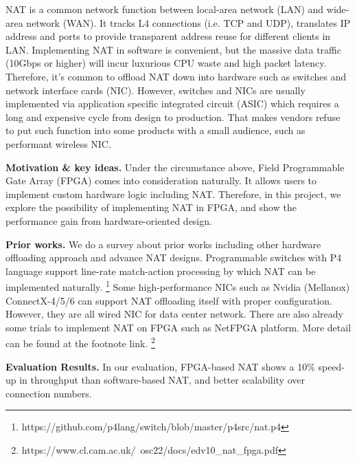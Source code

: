 





NAT is a common network function between local-area network (LAN) and wide-area
network (WAN). 
It tracks L4 connections (i.e. TCP and UDP), translates IP address and ports to 
provide transparent address reuse for different clients in LAN.
Implementing NAT in software is convenient, but the massive data traffic (10Gbps or higher) will incur luxurious CPU waste and high packet latency. Therefore, it's common to offload NAT down into hardware such as switches and network interface cards (NIC). 
However, switches and NICs are usually implemented via application specific integrated circuit (ASIC) which requires a long and expensive cycle from design to production. That makes vendors refuse to put such function into some products with a small audience, such as performant wireless NIC. 



\textbf{Motivation \& key ideas.} 
Under the circumstance above, Field Programmable Gate Array (FPGA) comes into consideration naturally. 
It allows users to implement custom hardware logic including NAT. Therefore, in this project, we explore the possibility of implementing NAT in FPGA, and show the performance gain from hardware-oriented design. 

\textbf{Prior works.} We do a survey about prior works including other hardware offloading approach and advance NAT designs. Programmable switches with P4 language support line-rate match-action processing by which NAT can be implemented naturally. 
\footnote[1]{https://github.com/p4lang/switch/blob/master/p4src/nat.p4}
Some high-performance NICs such as Nvidia (Mellanox) ConnectX-4/5/6 can support NAT offloading itself with proper configuration. However, they are all wired NIC for data center network.
There are also already some trials to implement NAT on FPGA such as NetFPGA platform. More detail can be found at the footnote link.
\footnote[2]{https://www.cl.cam.ac.uk/~osc22/docs/edv10\_nat\_fpga.pdf}

\textbf{Evaluation Results.} In our evaluation, FPGA-based NAT shows a 10\% speed-up in throughput than software-based NAT, and better scalability over connection numbers.

